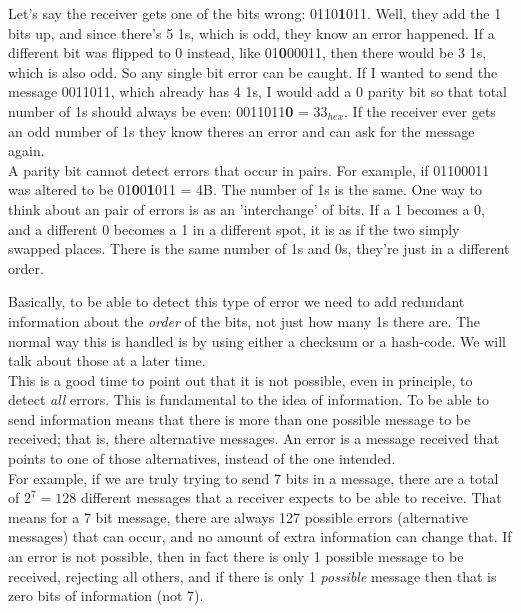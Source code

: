 Let's say the receiver gets one of the bits wrong: 0110\textbf{1}011. Well, they add the 1 bits up, and since there's 5 1s, which is odd, they know an error happened. If a different bit was flipped to 0 instead, like 01\textbf{0}00011, then there would be 3 1s, which is also odd. So any single bit error can be caught. If I wanted to send the message 0011011, which already has 4 1s, I would add a 0 parity bit so that total number of 1s should always be even: 0011011\textbf{0} = 33\(_{hex}\). If the receiver ever gets an odd number of 1s they know theres an error and can ask for the message again.\\

A parity bit cannot detect errors that occur in pairs. For example, if 01100011 was altered to be 01\textbf{0}0\textbf{1}011 = 4B. The number of 1s is the same. One way to think about an pair of errors is as an 'interchange' of bits. If a 1 becomes a 0, and a different 0 becomes a 1 in a different spot, it is as if the two simply swapped places. There is the same number of 1s and 0s, they're just in a different order.\\

\begin{center}\end{center}

Basically, to be able to detect this type of error we need to add redundant information about the \textit{order} of the bits, not just how many 1s there are. The normal way this is handled is by using either a checksum or a hash-code. We will talk about those at a later time.\\

This is a good time to point out that it is not possible, even in principle, to detect \textit{all} errors. This is fundamental to the idea of information. To be able to send information means that there is more than one possible message to be received; that is, there alternative messages. An error is a message received that points to one of those alternatives, instead of the one intended.\\

For example, if we are truly trying to send 7 bits in a message, there are a total of \(2^7 = 128\) different messages that a receiver expects to be able to receive. That means for a 7 bit message, there are always 127 possible errors (alternative messages) that can occur, and no amount of extra information can change that. If an error is not possible, then in fact there is only 1 possible message to be received, rejecting all others, and if there is only 1 \textit{possible} message then that is zero bits of information (not 7).\\

